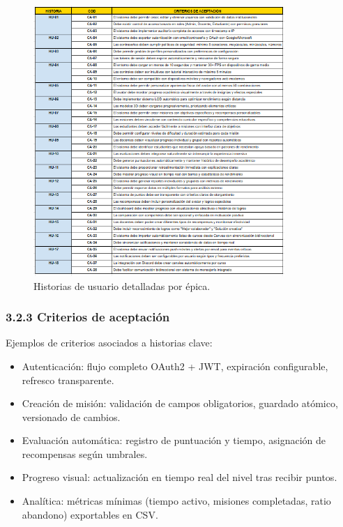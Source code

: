 \begin{figure}[H]
	\centering
	\includegraphics[width=0.85\textwidth]{images/historias_de_usuario.png}
	\caption{Historias de usuario detalladas por épica.}
	\label{fig:historias-usuario}
\end{figure}

\subsubsection{3.2.3 Criterios de aceptación}
Ejemplos de criterios asociados a historias clave:
\begin{itemize}
	\item Autenticación: flujo completo OAuth2 + JWT, expiración configurable, refresco transparente.
	\item Creación de misión: validación de campos obligatorios, guardado atómico, versionado de cambios.
	\item Evaluación automática: registro de puntuación y tiempo, asignación de recompensas según umbrales.
	\item Progreso visual: actualización en tiempo real del nivel tras recibir puntos.
	\item Analítica: métricas mínimas (tiempo activo, misiones completadas, ratio abandono) exportables en CSV.
\end{itemize}

